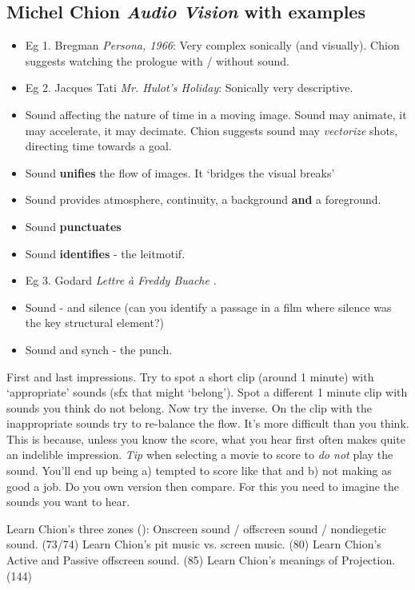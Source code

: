 \subsection{Michel Chion \textit{Audio Vision} with examples}
\begin{itemize}
\item Eg 1. Bregman \textit{Persona, 1966}: Very complex sonically (and visually). Chion suggests watching the prologue with / without sound. 
\item Eg 2. Jacques Tati \textit{Mr. Hulot's Holiday}: Sonically very descriptive. 
\item Sound affecting the nature of time in a moving image. Sound may animate, it may accelerate, it may decimate. Chion suggests sound may \textit{vectorize} shots, directing time towards a goal.
\item Sound \textbf{unifies} the flow of images. It `bridges the visual breaks' \citep[p.47]{chion1990} 
\item Sound provides atmosphere, continuity, a background \textbf{and} a foreground. 
\item Sound \textbf{punctuates}
\item Sound \textbf{identifies} - the leitmotif.
\item Eg 3. Godard \textit{Lettre \`a Freddy Buache} \citep[p.56]{chion1990}. 
\item Sound - and silence (can you identify a passage in a film where silence was the key structural element?)
\item Sound and synch - the punch. 
\end{itemize}

First and last impressions. Try to spot a short clip (around 1 minute) with `appropriate' sounds (sfx that might `belong'). Spot a different 1 minute clip with sounds you think do not belong. Now try the inverse. On the clip with the inappropriate sounds try to re-balance the flow. It's more difficult than you think. This is because, unless you know the score, what you hear first often makes quite an indelible impression. \textit{Tip} when selecting a movie to score to \textit{do not} play the sound. You'll end up being a) tempted to score like that and b) not making as good a job. Do you own version then compare. For this you need to imagine the sounds you want to hear. 

Learn Chion's three zones (\citep[p.73]{chion1990}): Onscreen sound / offscreen sound / nondiegetic sound. (73/74)
Learn Chion's pit music vs. screen music. (80)
Learn Chion's Active and Passive offscreen sound. (85) 
Learn Chion's meanings of Projection. (144) 

